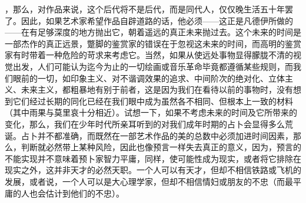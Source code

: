 ，那么，对作品来说，这个后代将不是后代，而是同代人，仅仅晚生活五十年罢了。因此，如果艺术家希望作品自辟道路的话，他必须——这正是凡德伊所做的——在有足够深度的地方抛出它，朝着遥远的真正未来抛过去。这个未来的时间是一部杰作的真正远景，蹩脚的鉴赏家的错误在于忽视这未来的时间，而高明的鉴赏家有时带着一种危险的苛求来考虑它。当然，如果从使远处事物显得朦胧不清的视觉出发，人们可能认为迄今为止的一切绘画或音乐革命毕竟都遵循某些规则，而我们眼前的一切，如印象主义、对不谐调效果的追求、中间阶次的绝对化、立体主义、未来主义，都粗暴地有别于前者，这是因为我们在看待以前的事物时，没有想到它们经过长期的同化已经在我们眼中成为虽然各不相同、但根本上一致的材料（其中雨果与莫里哀十分相近）。试想一下，如果不考虑未来的时间及它所带来的变化，那么，我们在少年时代所亲耳听到的对我们成年时期的占卜会显得多么荒诞。占卜并不都准确，而既然在一部艺术作品的美的总数中必须加进时间因素，那么，判断就必然带上某种风险，因此也像预言一样失去真正的意义，因为，预言的不能实现并不意味着预卜家智力平庸，同样，使可能性成为现实，或者将它排除在现实之外，这并非天才的必然天职。一个人可以有天才，但却不相信铁路或飞机的发展，或者说，一个人可以是大心理学家，但却不相信情妇或朋友的不忠（而最平庸的人也会估计到他们的不忠）。
